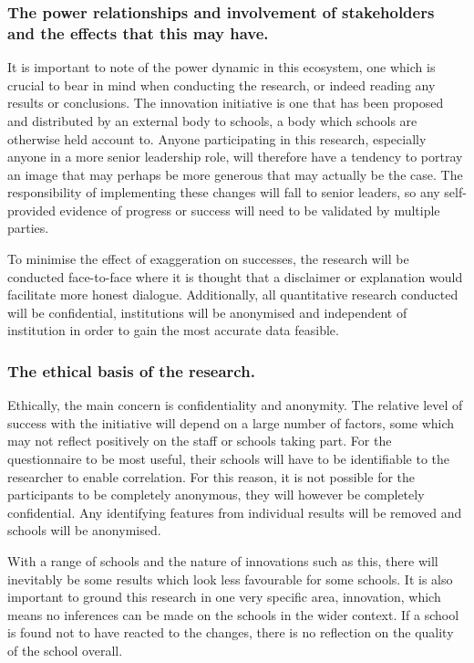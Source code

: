 \subsubsection{The power relationships and involvement of stakeholders and the effects that this may have.}

It is important to note of the power dynamic in this ecosystem, one which is crucial to bear in mind when conducting the research, or indeed reading any results or conclusions. The innovation initiative is one that has been proposed and distributed by an external body to schools, a body which schools are otherwise held account to. Anyone participating in this research, especially anyone in a more senior leadership role, will therefore have a tendency to portray an image that may perhaps be more generous that may actually be the case. The responsibility of implementing these changes will fall to senior leaders, so any self-provided evidence of progress or success will need to be validated by multiple parties.

To minimise the effect of exaggeration on successes, the research will be conducted face-to-face where it is thought that a disclaimer or explanation would facilitate more honest dialogue. Additionally, all quantitative research conducted will be confidential, institutions will be anonymised  and independent of institution in order to gain the most accurate data feasible. 

\subsubsection{The ethical basis of the research.}
Ethically, the main concern is confidentiality and anonymity. The relative level of success with the initiative will depend on a large number of factors, some which may not reflect positively on the staff or schools taking part. For the questionnaire to be most useful, their schools will have to be identifiable to the researcher to enable correlation. For this reason, it is not possible for the participants to be completely anonymous, they will however be completely confidential. Any identifying features from individual results will be removed and schools will be anonymised. 

With a range of schools and the nature of innovations such as this, there will inevitably be some results which look less favourable for some schools. It is also important to ground this research in one very specific area, innovation, which means no inferences can be made on the schools in the wider context. If a school is found not to have reacted to the changes, there is no reflection on the quality of the school overall.

